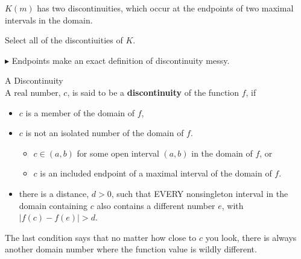 \documentclass{ximera}
\begin{document}
\begin{example}
\begin{image}
\end{image}

$K(m)$ has two discontinuities, which occur at the endpoints of two maximal intervals in the domain.








Select all of the discontiuities of $K$.
\begin{selectAll}
\end{selectAll}





\end{example}


$\blacktriangleright$ Endpoints make an exact definition of discontinuity messy. 







\begin{definition} A Discontinuity \\

A real number, $c$, is said to be a \textbf{discontinuity} of the function $f$, if

\begin{itemize}
\item $c$ is a member of the domain of $f$,

\item $c$ is not an isolated number of the domain of $f$.

\begin{itemize}
\item $c \in (a, b)$ for some open interval $(a, b)$ in the domain of $f$, or
\item $c$ is an included endpoint of a maximal interval of the domain of $f$. 
\end{itemize}

\item there is a distance, $d > 0$, such that EVERY nonsingleton interval in the domain containing $c$ also contains a different number $e$, with $ |f(c) - f(e)| > d$.

\end{itemize}

\end{definition}
The last condition says that no matter how close to $c$ you look, there is always another domain number where the function value is wildly different.
\end{document}

